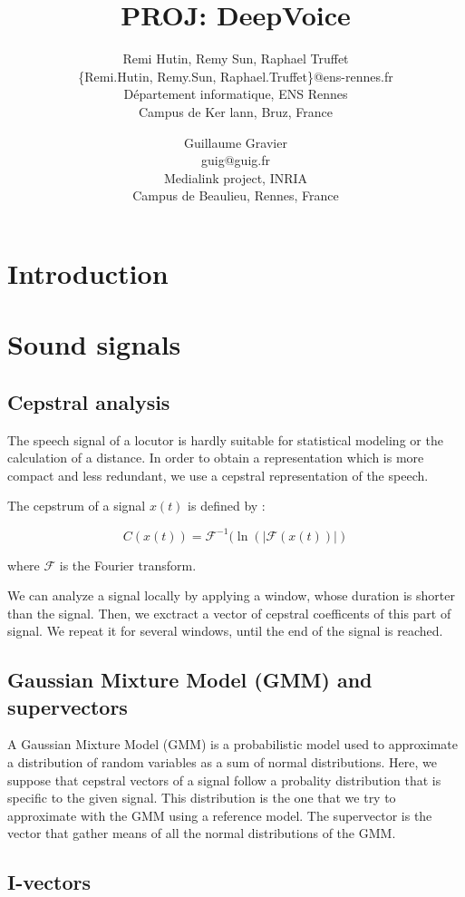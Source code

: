 \documentclass[conference]{IEEEtran}
\title{PROJ: DeepVoice}
\author{Remi Hutin, Remy Sun, Raphael Truffet \\
  \{Remi.Hutin, Remy.Sun, Raphael.Truffet\}@ens-rennes.fr \\
  Département informatique, ENS Rennes \\
  Campus de Ker lann, Bruz, France
\and
  Guillaume Gravier \\
  guig@guig.fr\\
  Medialink project, INRIA \\
  Campus de Beaulieu, Rennes, France
 }
\begin{document}
\maketitle

\section{Introduction}

\section{Sound signals}

\subsection{Cepstral analysis}

The speech signal of a locutor is hardly suitable for statistical modeling or the calculation of a distance.
In order to obtain a representation which is more compact and less redundant, we use a cepstral representation of the speech.

The cepstrum of a signal $x(t)$ is defined by :

$$C(x(t)) = \mathcal{F}^{-1}(\ln(|\mathcal{F}(x(t))|)$$

where $\mathcal{F}$ is the Fourier transform.


We can analyze a signal locally by applying a window, whose duration is shorter than the signal. Then, we exctract a vector of cepstral coefficents of this part of signal. We repeat it for several windows, until the end of the signal is reached.



\subsection{Gaussian Mixture Model (GMM) and supervectors}

A Gaussian Mixture Model (GMM) is a probabilistic model used to approximate a distribution of random variables as a sum of normal distributions. 
Here, we suppose that cepstral vectors of a signal follow a probality distribution that is specific to the given signal. This distribution is the one that we try to approximate with the GMM using a reference model. The supervector is the vector that gather means of all the normal distributions of the GMM.


\subsection{I-vectors}
\end{document}
